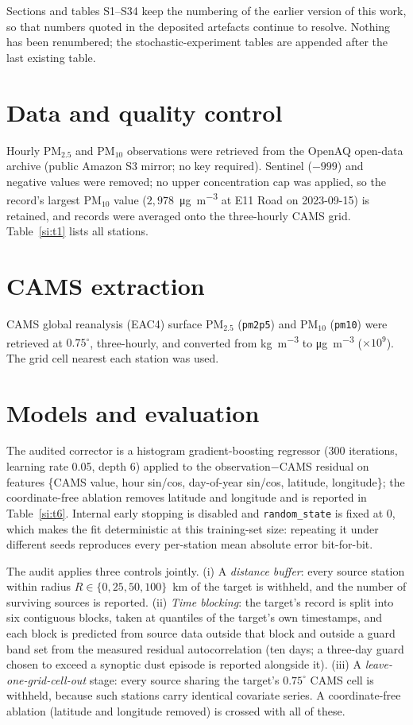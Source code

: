 \documentclass[11pt]{article}
\newcommand*{\pmten}{\ensuremath{\mathrm{PM_{10}}}}
\begin{document}
Sections and tables S1--S34 keep the numbering of the earlier version of this work, so that numbers
quoted in the deposited artefacts continue to resolve. Nothing has been renumbered; the
stochastic-experiment tables are appended after the last existing table.


\section{Data and quality control}
Hourly PM$_{2.5}$ and PM$_{10}$ observations were retrieved from the OpenAQ open-data archive (public Amazon S3 mirror; no key required). Sentinel ($-999$) and negative values were removed; no upper concentration cap was applied, so the record's largest \pmten{} value ($2{,}978$~\si{\micro\gram\per\cubic\metre} at E11 Road on 2023-09-15) is retained, and records were averaged onto the three-hourly CAMS grid. Table~\ref{si:t1} lists all stations.

\section{CAMS extraction}
CAMS global reanalysis (EAC4) surface PM$_{2.5}$ (\texttt{pm2p5}) and PM$_{10}$ (\texttt{pm10}) were retrieved at $0.75^\circ$, three-hourly, and converted from \si{\kilo\gram\per\cubic\metre} to \si{\micro\gram\per\cubic\metre} ($\times10^{9}$). The grid cell nearest each station was used.

\section{Models and evaluation}
The audited corrector is a histogram gradient-boosting regressor (300 iterations, learning rate
0.05, depth 6) applied to the observation$-$CAMS residual on features \{CAMS value, hour sin/cos,
day-of-year sin/cos, latitude, longitude\}; the coordinate-free ablation removes latitude and
longitude and is reported in Table~\ref{si:t6}. Internal early stopping is disabled and
\texttt{random\_state} is fixed at 0, which makes the fit deterministic at this training-set size:
repeating it under different seeds reproduces every per-station mean absolute error bit-for-bit.

The audit applies three controls jointly. (i) A \emph{distance buffer}: every source station within
radius $R\in\{0,25,50,100\}$~km of the target is withheld, and the number of surviving sources is
reported. (ii) \emph{Time blocking}: the target's record is split into six contiguous blocks, taken
at quantiles of the target's own timestamps, and each block is predicted from source data outside
that block and outside a guard band set from the measured residual autocorrelation (ten days; a
three-day guard chosen to exceed a synoptic dust episode is reported alongside it). (iii) A
\emph{leave-one-grid-cell-out} stage: every source sharing the target's $0.75^\circ$ CAMS cell is
withheld, because such stations carry identical covariate series. A coordinate-free ablation
(latitude and longitude removed) is crossed with all of these.
\end{document}
